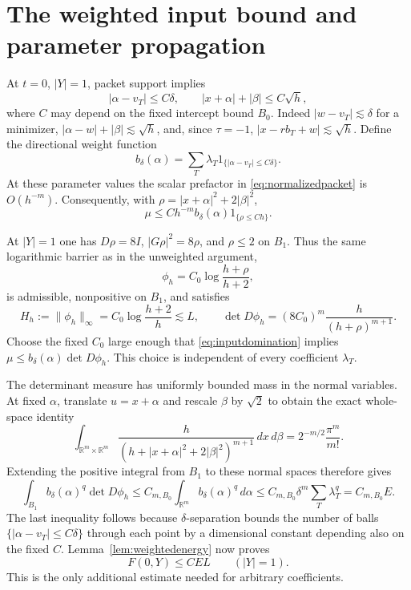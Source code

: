 \documentclass[11pt]{article}
\numberwithin{equation}{section}
\newcommand{\R}{\mathbb R}
\newcommand{\dd}{\,d}
\begin{document}
\section{The weighted input bound and parameter propagation}

At $t=0$, $|Y|=1$, packet support implies
\[
 |\alpha-v_T|\le C\delta,\qquad
 |x+\alpha|+|\beta|\le C\sqrt h,
\]
where $C$ may depend on the fixed intercept bound $B_0$.
Indeed $|w-v_T|\lesssim\delta$ for a minimizer,
$|\alpha-w|+|\beta|\lesssim\sqrt h$, and, since $\tau=-1$,
$|x-rb_T+w|\lesssim\sqrt h$.
Define the directional weight function
\[
 b_\delta(\alpha)=\sum_T\lambda_T
                        1_{\{|\alpha-v_T|\le C\delta\}}.
\]
At these parameter values the scalar prefactor in
\eqref{eq:normalizedpacket} is $O(h^{-m})$.
Consequently, with
$\rho=|x+\alpha|^2+2|\beta|^2$,
\begin{equation}\label{eq:inputdomination}
 \mu\le C h^{-m}b_\delta(\alpha)1_{\{\rho\le Ch\}}.
\end{equation}

At $|Y|=1$ one has $D\rho=8I$, $|G\rho|^2=8\rho$, and
$\rho\le2$ on $B_1$. Thus the same logarithmic barrier as in the
unweighted argument,
\[
 \phi_h=C_0\log\frac{h+\rho}{h+2},
\]
is admissible, nonpositive on $B_1$, and satisfies
\[
 H_h:=\|\phi_h\|_\infty
       =C_0\log\frac{h+2}{h}\lesssim L,\qquad
 \det D\phi_h=(8C_0)^m\frac{h}{(h+\rho)^{m+1}}.
\]
Choose the fixed $C_0$ large enough that
\eqref{eq:inputdomination} implies
$\mu\le b_\delta(\alpha)\det D\phi_h$.
This choice is independent of every coefficient $\lambda_T$.

The determinant measure has uniformly bounded mass in the normal
variables. At fixed $\alpha$, translate $u=x+\alpha$ and rescale
$\beta$ by $\sqrt2$ to obtain the exact whole-space identity
\[
 \int_{\R^m\times\R^m}
 \frac{h}{(h+|x+\alpha|^2+2|\beta|^2)^{m+1}}
       \dd x\dd\beta
 =2^{-m/2}\frac{\pi^m}{m!}.
\]
Extending the positive integral from $B_1$ to these normal spaces
therefore gives
\[
 \int_{B_1}b_\delta(\alpha)^q\det D\phi_h
 \le C_{m,B_0}\int_{\R^m}b_\delta(\alpha)^q\dd\alpha
 \le C_{m,B_0}\delta^m\sum_T\lambda_T^q=C_{m,B_0}E.
\]
The last inequality follows because $\delta$-separation bounds the
number of balls $\{|\alpha-v_T|\le C\delta\}$ through each point by
a dimensional constant depending also on the fixed $C$.
Lemma~\ref{lem:weightedenergy} now proves
\begin{equation}\label{eq:input}
 F(0,Y)\le C E L\qquad(|Y|=1).
\end{equation}
This is the only additional estimate needed for arbitrary coefficients.
\end{document}
